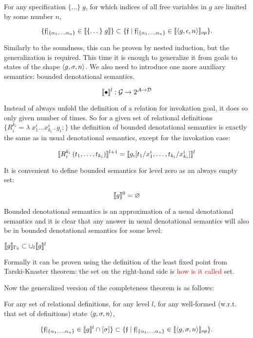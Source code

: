 \begin{theorem}
For any specification $\{\dots\}\; g$, for which indices of all free variables in $g$ are limited by some number $n$,

\[
\{\mathfrak{f}|_{\{\alpha_1,\dots,\alpha_n\}} \in \llbracket{\{\dots\}\; g}\rrbracket\} \subset \{\mathfrak{f} \mid \mathfrak{f}|_{\{\alpha_1,\dots,\alpha_n\}} \in \llbracket{\left<{g, \epsilon, n}\right>}\rrbracket_{op}\}.
\]
\end{theorem}


Similarly to the soundness, this can be proven by nested induction, but the generalization is required. This time it is enough to generalize it from goals to states of the shape $\left<{g, \sigma, n}\right>$. We also need to introduce one more auxiliary semantics: bounded denotational semantics.

\[
\llbracket{\bullet}\rrbracket^l : \mathcal{G} \to 2^{\mathcal{A}\to\mathcal{D}}
\]

Instead of always unfold the definition of a relation for invokation goal, it does so only given number of times. So for a given set of relational definitions $\{R_i^{k_i} = \lambda\;x_1^i\dots x_{k_i}^i\,.\, g_i;\}$ the definition of bounded denotational semantics is exactly the same as in usual denotational semantics, except for the invokation case:

\[
\llbracket{R_i^{k_i}\,(t_1,\dots,t_{k_i})}\rrbracket^{l+1} = \llbracket{g_i[t_1/x_1^i, \dots, t_{k_i}/x_{k_i}^i]}\rrbracket^{l}
\]

It is convenient to define bounded semantics for level zero as an always empty set:

\[
\llbracket{g}\rrbracket^{0} = \varnothing
\]

Bounded denotational semantics is an approximation of a usual denotational semantics and it is clear that any answer in usual denotational semantics will also be in bounded denotational semantics for some level:

\begin{lemma}
$\llbracket{g}\rrbracket_{\Gamma_0} \subset \cup_l \llbracket{g}\rrbracket^l$
\end{lemma}

Formally it can be proven using the definition of the least fixed point from Tarski-Knaster theorem: the set on the right-hand side is \textcolor{red}{how is it called} set.

Now the generalized version of the completeness theorem is as follows:

\begin{lemma}
For any set of relational definitions, for any level $l$, for any well-formed (w.r.t. that set of definitions) state $\left<{g, \sigma, n}\right>$,

\[
\{\mathfrak{f}|_{\{\alpha_1,\dots,\alpha_n\}} \in \llbracket{g}\rrbracket^l \cap [\sigma]\} \subset \{\mathfrak{f} \mid \mathfrak{f}|_{\{\alpha_1,\dots,\alpha_n\}} \in \llbracket{\left<{g, \sigma, n}\right>}\rrbracket_{op}\}.
\]
\end{lemma}

